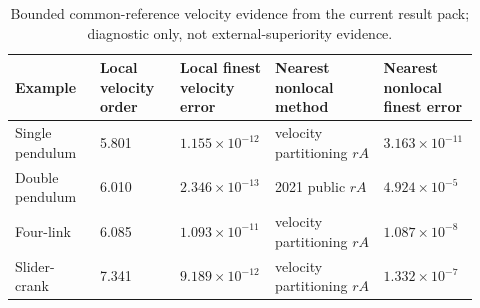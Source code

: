 \documentclass[preprint,12pt]{elsarticle}
\begin{document}
\begin{table}[htbp]
\centering
\caption{Bounded common-reference velocity evidence from the current result pack; diagnostic only, not external-superiority evidence.}
\label{tab:common-reference-pack}
\scriptsize
\setlength{\tabcolsep}{3pt}
\renewcommand{\arraystretch}{0.88}
\begin{tabular}{P{0.18\linewidth}P{0.17\linewidth}P{0.17\linewidth}P{0.23\linewidth}P{0.17\linewidth}}
\toprule
Example & Local velocity order & Local finest velocity error & Nearest nonlocal method & Nearest nonlocal finest error \\
\midrule
Single pendulum & 5.801 & $1.155\times10^{-12}$ &
velocity partitioning $rA$ & $3.163\times10^{-11}$ \\
Double pendulum & 6.010 & $2.346\times10^{-13}$ &
2021 public $rA$ & $4.924\times10^{-5}$ \\
Four-link & 6.085 & $1.093\times10^{-11}$ &
velocity partitioning $rA$ & $1.087\times10^{-8}$ \\
Slider-crank & 7.341 & $9.189\times10^{-12}$ &
velocity partitioning $rA$ & $1.332\times10^{-7}$ \\
\bottomrule
\end{tabular}
\end{table}
\end{document}
